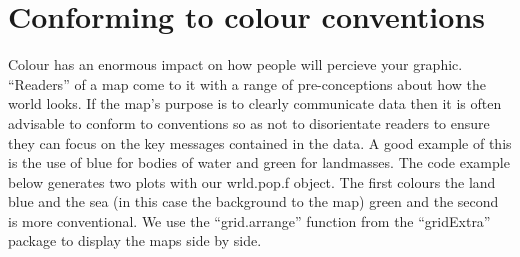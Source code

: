 \documentclass[]{article}
\begin{document}
\section{Conforming to colour conventions}

Colour has an enormous impact on how people will percieve your graphic.
``Readers'' of a map come to it with a range of pre-conceptions about
how the world looks. If the map's purpose is to clearly communicate data
then it is often advisable to conform to conventions so as not to
disorientate readers to ensure they can focus on the key messages
contained in the data. A good example of this is the use of blue for
bodies of water and green for landmasses. The code example below
generates two plots with our wrld.pop.f object. The first colours the
land blue and the sea (in this case the background to the map) green and
the second is more conventional. We use the ``grid.arrange'' function
from the ``gridExtra'' package to display the maps side by side.
\end{document}
